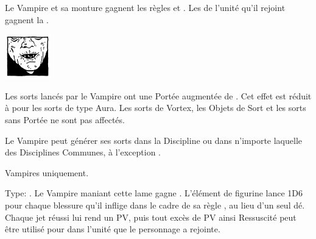 \begin{multicols}{2}
 Le Vampire et sa monture gagnent les règles \poisonedattacks{} et . Les \ghouls{} de l'unité qu'il rejoint gagnent la \hatred{}.

\endpricelist

\begin{center}\includegraphics[width=2cm]{pics/logo_nosferatu.png}\end{center}
\vspace*{-1.2cm}

\startpricelist

 Les sorts lancés par le Vampire ont une Portée augmentée de . Cet effet est réduit à  pour les sorts de type Aura. Les sorts de Vortex, les Objets de Sort et les sorts sans Portée ne sont pas affectés.

 Le Vampire peut générer ses sorts dans la Discipline \necromancy{} ou dans n'importe laquelle des Disciplines Communes, à l'exception \nature{}.

\endpricelist

\end{multicols}

\closearmynewsection

\startarmymagicalitems

\armymagicalweapons

\startpricelist

 Vampires uniquement.

Type: \hw{}. Le Vampire maniant cette lame gagne . L'élément de figurine lance 1D6 pour chaque blessure qu'il inflige dans le cadre de sa règle \vampiric{}, au lieu d'un seul dé. Chaque jet \vampiric{} réussi lui rend un PV, puis tout excès de PV ainsi Ressuscité peut être utilisé pour \raisewounds{} dans l'unité que le personnage a rejointe.

\endpricelist

\armymagicalarmour

\startpricelist

